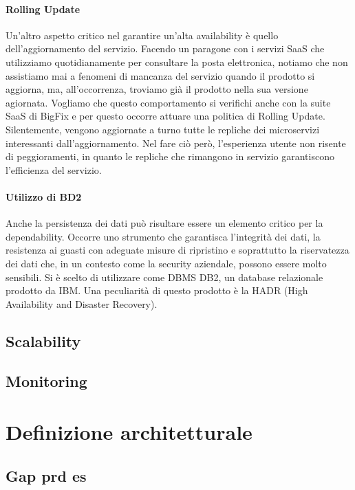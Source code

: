\paragraph{Rolling Update}
Un'altro aspetto critico nel garantire un'alta availability è quello dell'aggiornamento del servizio. Facendo un paragone con i servizi SaaS che utilizziamo quotidianamente per consultare la posta elettronica, notiamo che non assistiamo mai a fenomeni di mancanza del servizio quando il prodotto si aggiorna, ma, all'occorrenza, troviamo già il prodotto nella sua versione agiornata. Vogliamo che questo comportamento si verifichi anche con la suite SaaS di BigFix e per questo occorre attuare una politica di Rolling Update. Silentemente, vengono aggiornate a turno tutte le repliche dei microservizi interessanti dall'aggiornamento. Nel fare ciò però, l'esperienza utente non risente di peggioramenti, in quanto le repliche che rimangono in servizio garantiscono l'efficienza del servizio.

\paragraph{Utilizzo di BD2}
Anche la persistenza dei dati può risultare essere un elemento critico per la dependability. Occorre uno strumento che garantisca l'integrità dei dati, la resistenza ai guasti con adeguate misure di ripristino e soprattutto la riservatezza dei dati che, in un contesto come la security aziendale, possono essere molto sensibili. Si è scelto di utilizzare come DBMS DB2, un database relazionale prodotto da IBM. Una peculiarità di questo prodotto è la HADR (High Availability and Disaster Recovery). 


\subsection{Scalability}



\subsection{Monitoring}




\section{Definizione architetturale}

\subsection{Gap prd es}


